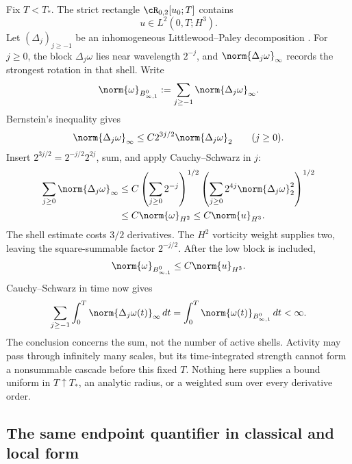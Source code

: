 Fix \(T<T_*\).  The strict rectangle \(\cR_{0,2}[u_0;T]\) contains
\[
  u\in L^2(0,T;H^3).
\]
Let \((\Delta_j)_{j\geq-1}\) be an inhomogeneous Littlewood--Paley decomposition
\parencite[Chapter~2]{BahouriCheminDanchin2011}.  For \(j\geq0\), the block
\(\Delta_j\omega\) lies near wavelength \(2^{-j}\), and
\(\norm{\Delta_j\omega}_\infty\) records the strongest rotation in that shell.  Write
\[
  \norm{\omega}_{B^0_{\infty,1}}
  :=\sum_{j\geq-1}\norm{\Delta_j\omega}_\infty.
\]
Bernstein's inequality gives
\[
  \norm{\Delta_j\omega}_\infty
  \leq C2^{3j/2}\norm{\Delta_j\omega}_2
  \qquad(j\geq0).
\]
Insert \(2^{3j/2}=2^{-j/2}2^{2j}\), sum, and apply Cauchy--Schwarz in \(j\):
\begin{align*}
  \sum_{j\geq0}\norm{\Delta_j\omega}_\infty
  &\leq
  C\left(\sum_{j\geq0}2^{-j}\right)^{1/2}
  \left(\sum_{j\geq0}2^{4j}\norm{\Delta_j\omega}_2^2\right)^{1/2}
  \\
  &\leq C\norm{\omega}_{H^2}
  \leq C\norm{u}_{H^3}.
\end{align*}
The shell estimate costs \(3/2\) derivatives.  The \(H^2\) vorticity weight supplies
two, leaving the square-summable factor \(2^{-j/2}\).  After the low block is included,
\begin{equation}\label{eq:VorticityBesovFromHThree}
  \norm{\omega}_{B^0_{\infty,1}}
  \leq C\norm{u}_{H^3}.
\end{equation}
Cauchy--Schwarz in time now gives
\begin{equation}\label{eq:FiniteDyadicVorticityAction}
  \sum_{j\geq-1}
  \int_0^{T}\norm{\Delta_j\omega(t)}_\infty\,dt
  =\int_0^{T}\norm{\omega(t)}_{B^0_{\infty,1}}\,dt
  <\infty.
\end{equation}
The conclusion concerns the sum, not the number of active shells.  Activity may pass
through infinitely many scales, but its time-integrated strength cannot form a
nonsummable cascade before this fixed \(T\).  Nothing here supplies a bound uniform in
\(T\uparrow T_*\), an analytic radius, or a weighted sum over every derivative order.

\subsection{The same endpoint quantifier in classical and local form}\label{sub:ClassicalCriteriaInsideFiniteRectangles}

